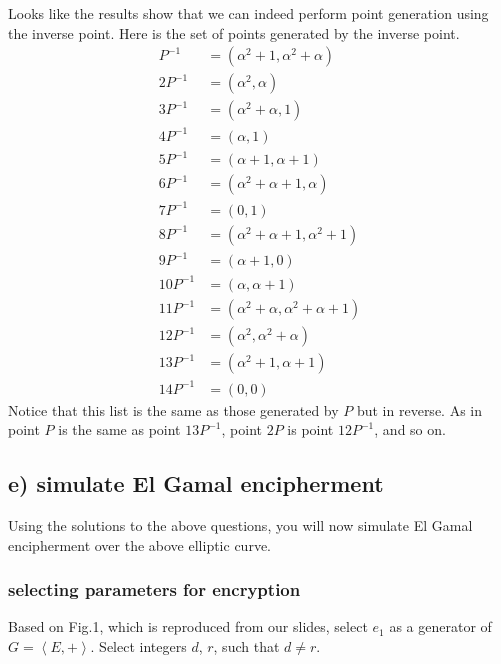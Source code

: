 \documentclass[a4paper,11pt]{exam}
\begin{document}
\noindent
Looks like the results show that we can indeed perform point generation using the inverse point. Here is the set of points generated by the inverse point. 
\begin{align*}
  P^{-1} &= (\alpha^2+1, \alpha^2+\alpha)\\
  2P^{-1} &= (\alpha^2, \alpha)\\
  3P^{-1} &= (\alpha^2+\alpha, 1)\\
  4P^{-1} &= (\alpha, 1)\\
  5P^{-1} &= (\alpha+1, \alpha+1)\\
  6P^{-1} &= (\alpha^2+\alpha+1, \alpha)\\
  7P^{-1} &= (0, 1)\\
  8P^{-1} &= (\alpha^2+\alpha+1, \alpha^2+1)\\
  9P^{-1} &= (\alpha+1, 0)\\
  10P^{-1} &= (\alpha, \alpha+1)\\
  11P^{-1} &= (\alpha^2+\alpha, \alpha^2+\alpha+1)\\
  12P^{-1} &= (\alpha^2, \alpha^2+\alpha)\\
  13P^{-1} &= (\alpha^2+1, \alpha+1)\\
  14P^{-1} &= (0, 0)
 \end{align*}
 \noindent
Notice that this list is the same as those generated by \(P\) but in reverse. As in point \(P\) is the same as point \(13P^{-1}\), point \(2P\) is point \(12P^{-1}\), and so on.

\subsection{e) simulate El Gamal encipherment}
\label{sec:org2c6307b}
Using the solutions to the above questions, you will now simulate El Gamal encipherment over the above elliptic curve.

\subsubsection{selecting parameters for encryption}
\label{sec:org77830de}
Based on Fig.1, which is reproduced from our slides, select \(e_1\) as a generator of \(G = \left<E, +\right>\). Select integers \(d\), \(r\), such that \(d \ne r\).
\end{document}
